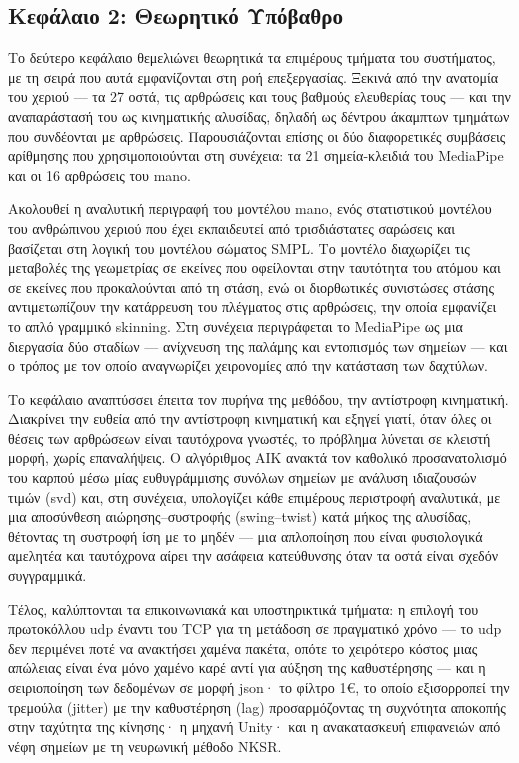 \subsection*{Κεφάλαιο 2: Θεωρητικό Υπόβαθρο}

Το δεύτερο κεφάλαιο θεμελιώνει θεωρητικά τα επιμέρους τμήματα του συστήματος,
με τη σειρά που αυτά εμφανίζονται στη ροή επεξεργασίας. Ξεκινά από την
ανατομία του χεριού --- τα 27 οστά, τις αρθρώσεις και τους βαθμούς ελευθερίας
τους --- και την αναπαράστασή του ως κινηματικής αλυσίδας, δηλαδή ως δέντρου
άκαμπτων τμημάτων που συνδέονται με αρθρώσεις. Παρουσιάζονται επίσης οι δύο
διαφορετικές συμβάσεις αρίθμησης που χρησιμοποιούνται στη συνέχεια: τα 21
σημεία-κλειδιά του MediaPipe και οι 16 αρθρώσεις του \acrshort{mano}.

Ακολουθεί η αναλυτική περιγραφή του μοντέλου \acrshort{mano}, ενός στατιστικού
μοντέλου του ανθρώπινου χεριού που έχει εκπαιδευτεί από τρισδιάστατες σαρώσεις
και βασίζεται στη λογική του μοντέλου σώματος SMPL. Το μοντέλο διαχωρίζει τις
μεταβολές της γεωμετρίας σε εκείνες που οφείλονται στην ταυτότητα του ατόμου
και σε εκείνες που προκαλούνται από τη στάση, ενώ οι διορθωτικές συνιστώσες
στάσης αντιμετωπίζουν την κατάρρευση του πλέγματος στις αρθρώσεις, την οποία
εμφανίζει το απλό γραμμικό skinning. Στη συνέχεια περιγράφεται το MediaPipe ως
μια διεργασία δύο σταδίων --- ανίχνευση της παλάμης και εντοπισμός των σημείων
--- και ο τρόπος με τον οποίο αναγνωρίζει χειρονομίες από την κατάσταση των
δαχτύλων.

Το κεφάλαιο αναπτύσσει έπειτα τον πυρήνα της μεθόδου, την αντίστροφη
κινηματική. Διακρίνει την ευθεία από την αντίστροφη κινηματική και εξηγεί
γιατί, όταν όλες οι θέσεις των αρθρώσεων είναι ταυτόχρονα γνωστές, το πρόβλημα
λύνεται σε κλειστή μορφή, χωρίς επαναλήψεις. Ο αλγόριθμος AIK ανακτά τον
καθολικό προσανατολισμό του καρπού μέσω μίας ευθυγράμμισης συνόλων σημείων με
ανάλυση ιδιαζουσών τιμών (\acrshort{svd}) και, στη συνέχεια, υπολογίζει κάθε
επιμέρους περιστροφή αναλυτικά, με μια αποσύνθεση αιώρησης--συστροφής
(swing--twist) κατά μήκος της αλυσίδας, θέτοντας τη συστροφή ίση με το μηδέν
--- μια απλοποίηση που είναι φυσιολογικά αμελητέα και ταυτόχρονα αίρει την
ασάφεια κατεύθυνσης όταν τα οστά είναι σχεδόν συγγραμμικά.

Τέλος, καλύπτονται τα επικοινωνιακά και υποστηρικτικά τμήματα: η επιλογή του
πρωτοκόλλου \acrshort{udp} έναντι του TCP για τη μετάδοση σε πραγματικό χρόνο
--- το \acrshort{udp} δεν περιμένει ποτέ να ανακτήσει χαμένα πακέτα, οπότε το
χειρότερο κόστος μιας απώλειας είναι ένα μόνο χαμένο καρέ αντί για αύξηση της
καθυστέρησης --- και η σειριοποίηση των δεδομένων σε μορφή \acrshort{json}· το
φίλτρο 1\euro{}, το οποίο εξισορροπεί την τρεμούλα (jitter) με την καθυστέρηση
(lag) προσαρμόζοντας τη συχνότητα αποκοπής στην ταχύτητα της κίνησης· η μηχανή
Unity· και η ανακατασκευή επιφανειών από νέφη σημείων με τη νευρωνική μέθοδο NKSR.




